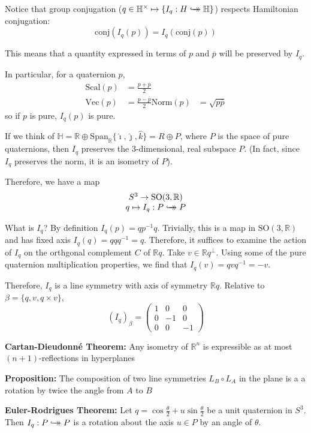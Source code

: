 \documentclass[12pt]{article}
\renewcommand{\hat}[1]{\widehat{#1}}
\newcommand{\R}{\mathbb{R}}
\renewcommand{\H}{\mathbb{H}}
\newcommand{\SO}{\text{SO}}
\newcommand{\biject}{\hookrightarrow \hspace{-8pt} \rightarrow}
\newcommand{\conj}{\text{conj}}
\renewcommand{\bar}[1]{\overline{#1}}
\newcommand{\ihat}{\hat{\imath}}
\newcommand{\jhat}{\hat{\jmath}}
\newcommand{\khat}{\hat{k}}
\begin{document}
Notice that group conjugation ($q \in \H^{\times} \mapsto \{I_q: H \biject \H\}$) respects Hamiltonian conjugation:
\[\conj(I_q(p)) = I_q(\conj(p))\]

This means that a quantity expressed in terms of $p$ and $\bar p$ will be preserved by $I_q$. 

In particular, for a quaternion $p$, 
\begin{align*}
    \text{Scal}(p) &= \frac{p + \bar p}{2}\\
    \text{Vec}(p) &= \frac{p - \bar p}{2}
    \text{Norm}(p) &= \sqrt{p \bar p}
\end{align*}
so if $p$ is pure, $I_q(p)$ is pure. 

If we think of $\H = \R \oplus \text{Span}_{\R}\{\ihat, \jhat, \khat\} = R \oplus P$, where $P$ is the space of pure quaternions, then $I_q$ preserves the 3-dimensional, real subspace $P$. (In fact, since $I_q$ preserves the norm, it is an isometry of $P$). 

Therefore, we have a map 
\[\begin{array}{c}
    S^3 \to \SO(3, \R)\\ 
    q \mapsto I_q: P \biject P
\end{array}\]

What is $I_q$? By definition $I_q(p) = q p^{-1} q$. Trivially, this is a map in $\SO(3, \R)$ and has fixed axis $I_q(q) = qqq^{-1} = q$. Therefore, it suffices to examine the action of $I_q$ on the orthgonal complement $C$ of $\R q$. Take $v \in \R q^{\perp}$. Using some of the pure quaternion multiplication properties, we find that $I_q(v) = qvq^{-1} = -v$.

Therefore, $I_q$ is a line symmetry with axis of symmetry $\R q$. Relative to $\beta = \{q, v, q \times v\}$, 
\[(I_q)_{\beta} = \begin{pmatrix}
    1 & 0 & 0\\
    0 & -1 & 0\\
    0 & 0 & -1
\end{pmatrix}\] 

\textbf{Cartan-Dieudonné Theorem:} Any isometry of $\R^n$ is expressible as at most $(n+1)$-reflections in hyperplanes 

\textbf{Proposition:} The composition of two line symmetries $L_B \circ L_A$ in the plane is a a rotation by twice the angle from $A$ to $B$ 

\textbf{Euler-Rodrigues Theorem:} Let $q = \cos \frac{\theta}{2} + u \sin \frac{\theta}{2}$ be a unit quaternion in $S^3$. Then $I_q: P \biject P$ is a rotation about the axis $u \in P$ by an angle of $\theta$.
\end{document}
